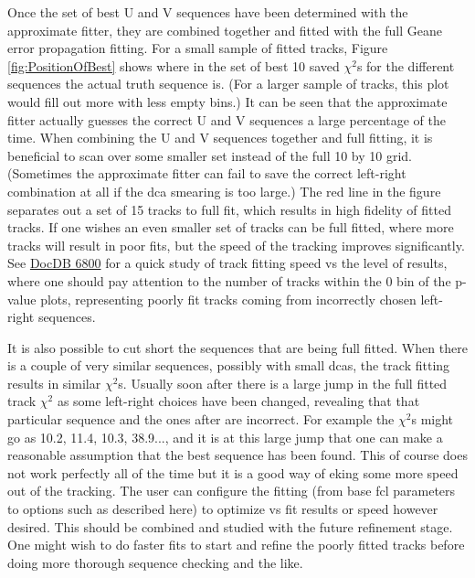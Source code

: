  	  Once the set of best U and V sequences have been determined with the approximate fitter, they are combined together and fitted with the full Geane error propagation fitting. For a small sample of fitted tracks, Figure \ref{fig:PositionOfBest} shows where in the set of best 10 saved $\chi^{2}$s for the different sequences the actual truth sequence is. (For a larger sample of tracks, this plot would fill out more with less empty bins.) It can be seen that the approximate fitter actually guesses the correct U and V sequences a large percentage of the time. When combining the U and V sequences together and full fitting, it is beneficial to scan over some smaller set instead of the full 10 by 10 grid. (Sometimes the approximate fitter can fail to save the correct left-right combination at all if the dca smearing is too large.) The red line in the figure separates out a set of 15 tracks to full fit, which results in high fidelity of fitted tracks. If one wishes an even smaller set of tracks can be full fitted, where more tracks will result in poor fits, but the speed of the tracking improves significantly. See \href{https://gm2-docdb.fnal.gov/cgi-bin/private/ShowDocument?docid=6800}{DocDB 6800} for a quick study of track fitting speed vs the level of results, where one should pay attention to the number of tracks within the 0 bin of the p-value plots, representing poorly fit tracks coming from incorrectly chosen left-right sequences. 

 	  It is also possible to cut short the sequences that are being full fitted. When there is a couple of very similar sequences, possibly with small dcas, the track fitting results in similar $\chi^{2}$s. Usually soon after there is a large jump in the full fitted track $\chi^{2}$ as some left-right choices have been changed, revealing that that particular sequence and the ones after are incorrect. For example the $\chi^{2}$s might go as 10.2, 11.4, 10.3, 38.9..., and it is at this large jump that one can make a reasonable assumption that the best sequence has been found. This of course does not work perfectly all of the time but it is a good way of eking some more speed out of the tracking. The user can configure the fitting (from base fcl parameters to options such as described here) to optimize vs fit results or speed however desired. This should be combined and studied with the future refinement stage. One might wish to do faster fits to start and refine the poorly fitted tracks before doing more thorough sequence checking and the like.


